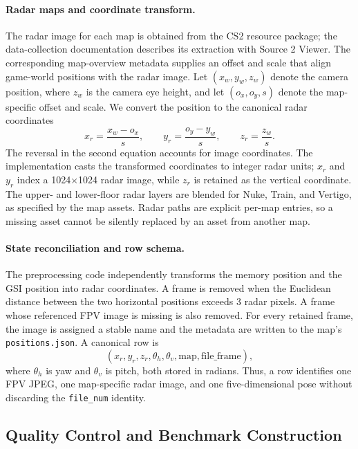 \paragraph{Radar maps and coordinate transform.}
The radar image for each map is obtained from the CS2 resource package; the
data-collection documentation describes its extraction with Source 2 Viewer.
The corresponding map-overview metadata supplies an offset and scale that
align game-world positions with the radar image.  Let
$(x_w,y_w,z_w)$ denote the camera position, where $z_w$ is the camera eye
height, and let $(o_x,o_y,s)$ denote the map-specific offset and scale.  We
convert the position to the canonical radar coordinates
\begin{equation}
    x_r = \frac{x_w-o_x}{s}, \qquad
    y_r = \frac{o_y-y_w}{s}, \qquad
    z_r = \frac{z_w}{s}.
\end{equation}
The reversal in the second equation accounts for image coordinates.  The
implementation casts the transformed coordinates to integer radar units;
$x_r$ and $y_r$ index a 1024$\times$1024 radar image, while $z_r$ is retained
as the vertical coordinate.  The upper- and lower-floor radar layers are
blended for Nuke, Train, and Vertigo, as specified by the map assets.  Radar
paths are explicit per-map entries, so a missing asset cannot be silently
replaced by an asset from another map.

\paragraph{State reconciliation and row schema.}
The preprocessing code independently transforms the memory position and the
GSI position into radar coordinates.  A frame is removed when the Euclidean
distance between the two horizontal positions exceeds 3 radar pixels.  A
frame whose referenced FPV image is missing is also removed.  For every
retained frame, the image is assigned a stable name and the metadata are
written to the map's \texttt{positions.json}.  A canonical row is
\begin{equation}
    (x_r,y_r,z_r,\theta_h,\theta_v,\mathrm{map},\mathrm{file\_frame}),
\end{equation}
where $\theta_h$ is yaw and $\theta_v$ is pitch, both stored in radians.
Thus, a row identifies one FPV JPEG, one map-specific radar image, and one
five-dimensional pose without discarding the \texttt{file\_num} identity.

\subsection{Quality Control and Benchmark Construction}
\label{subsec:data_filter}

